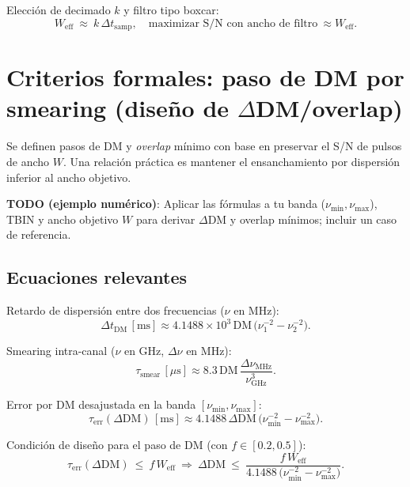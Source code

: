 Elección de decimado \(k\) y filtro tipo boxcar:
\begin{equation}\label{eq:weff_decimation}
W_{\mathrm{eff}}\ \approx\ k\,\Delta t_{\mathrm{samp}},\quad \text{maximizar S/N con ancho de filtro} \ \approx W_{\mathrm{eff}}.
\end{equation}

\section{Criterios formales: paso de DM por smearing (diseño de $\Delta$DM/overlap)}
Se definen pasos de DM y \textit{overlap} mínimo con base en preservar el S/N de pulsos de ancho \(W\). Una relación práctica es mantener el ensanchamiento por dispersión inferior al ancho objetivo.

\textbf{TODO (ejemplo numérico)}: Aplicar las fórmulas a tu banda (\(\nu_{\min},\nu_{\max}\)), TBIN y ancho objetivo \(W\) para derivar \(\Delta\mathrm{DM}\) y overlap mínimos; incluir un caso de referencia.

\subsection*{Ecuaciones relevantes}
Retardo de dispersión entre dos frecuencias (\(\nu\) en MHz):
\begin{equation}\label{eq:dm_delay_band}
\Delta t_{\mathrm{DM}}\,[\mathrm{ms}] \approx 4.1488\times10^{3}\,\mathrm{DM}\,\big(\nu_1^{-2}-\nu_2^{-2}\big).
\end{equation}

Smearing intra-canal (\(\nu\) en GHz, \(\Delta\nu\) en MHz):
\begin{equation}\label{eq:smear_intrach}
\tau_{\mathrm{smear}}\,[\mu\mathrm{s}] \approx 8.3\,\mathrm{DM}\,\frac{\Delta\nu_{\mathrm{MHz}}}{\nu_{\mathrm{GHz}}^{3}}.
\end{equation}

Error por DM desajustada en la banda \([\nu_{\min},\nu_{\max}]\):
\begin{equation}\label{eq:dm_error}
\tau_{\mathrm{err}}(\Delta\mathrm{DM})\,[\mathrm{ms}] \approx 4.1488\,\Delta\mathrm{DM}\,\big(\nu_{\min}^{-2}-\nu_{\max}^{-2}\big).
\end{equation}

Condición de diseño para el paso de DM (con \(f\in[0.2,0.5]\)):
\begin{equation}\label{eq:dm_step_criterion}
\tau_{\mathrm{err}}(\Delta\mathrm{DM})\ \le\ f\,W_{\mathrm{eff}}\ \Rightarrow\ \Delta\mathrm{DM}\ \le\ \frac{f\,W_{\mathrm{eff}}}{4.1488\,\big(\nu_{\min}^{-2}-\nu_{\max}^{-2}\big)}.
\end{equation}

